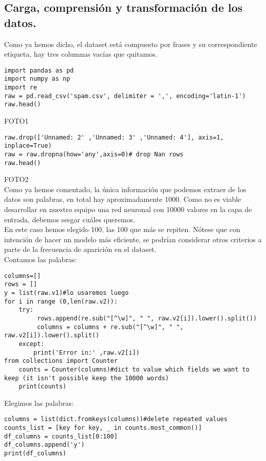 \documentclass[a4paper,10pt]{article}
\begin{document}
\subsection{Carga, comprensión y transformación de los datos.}
Como ya hemos dicho, el dataset está compuesto por frases y su correspondiente etiqueta, hay tres columnas vacías que quitamos.
\begin{lstlisting}
import pandas as pd
import numpy as np
import re
raw = pd.read_csv('spam.csv', delimiter = ',', encoding='latin-1')
raw.head()
\end{lstlisting}
FOTO1
\begin{lstlisting}
raw.drop(['Unnamed: 2' ,'Unnamed: 3' ,'Unnamed: 4'], axis=1, inplace=True)
raw = raw.dropna(how='any',axis=0)# drop Nan rows
raw.head()
\end{lstlisting}
FOTO2\\
Como ya hemos comentado, la única información que podemos extraer de los datos son palabras, en total hay aproximadamente 1000. Como no es viable desarrollar en nuestro equipo una red neuronal con 10000 valores en la capa de entrada, debemos sesgar cuáles queremos.\\ En este caso hemos elegido 100, las 100 que más se repiten. Nótese que con intención de hacer un modelo más eficiente, se podrían considerar otros criterios a parte de la frecuencia de aparición en el dataset.\\
Contamos las palabras:
\begin{lstlisting}
columns=[] 
rows = [] 
y = list(raw.v1)#lo usaremos luego 
for i in range (0,len(raw.v2)): 
    try:
         rows.append(re.sub("[^\w]", " ", raw.v2[i]).lower().split()) 
         columns = columns + re.sub("[^\w]", " ", raw.v2[i]).lower().split() 
    except: 
        print('Error in:' ,raw.v2[i])
from collections import Counter 
    counts = Counter(columns)#dict to value which fields we want to keep (it isn't possible keep the 10000 words)
    print(counts)
\end{lstlisting}
Elegimos las palabras:
\begin{lstlisting}
columns = list(dict.fromkeys(columns))#delete repeated values 
counts_list = [key for key, _ in counts.most_common()] 
df_columns = counts_list[0:100] 
df_columns.append('y') 
print(df_columns)
\end{lstlisting}
\end{document}

